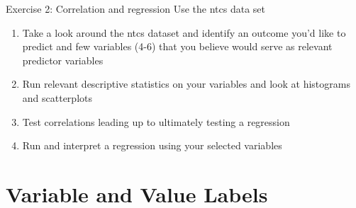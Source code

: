 \documentclass[table,smaller]{beamer}
\begin{document}
\begin{frame}[label=sec-3-4]{Exercise 2: Correlation and regression}
Use the ntcs data set

\begin{enumerate}
\item Take a look around the ntcs dataset and identify an outcome you'd like to predict and few variables (4-6) that you believe would serve as relevant predictor variables
\item Run relevant descriptive statistics on your variables and look at histograms and scatterplots
\item Test correlations leading up to ultimately testing a regression
\item Run and interpret a regression using your selected variables
\end{enumerate}
\end{frame}
\section{Variable and Value Labels}
\label{sec-4}
\end{document}

